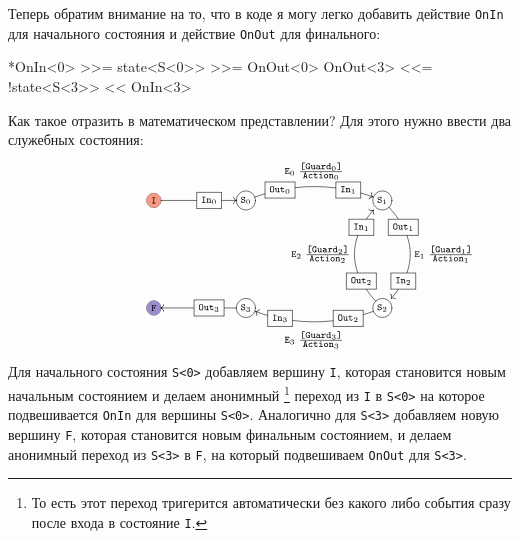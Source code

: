 \documentclass{article}
\begin{document}
{Теперь обратим внимание на то, что в коде я могу легко добавить действие \verb"OnIn" для начального состояния и действие \verb"OnOut" для финального:
\begin{cppcode}[\nonumbers]
*OnIn<0> >>= state<S<0>> >>= OnOut<0>
OnOut<3> <<= !state<S<3>> << OnIn<3>
\end{cppcode}
Как такое отразить в математическом представлении?
Для этого нужно ввести два служебных состояния:
\[
\xymatrix@R=60pt{
*+=+[o]{\phantom{\scriptstyle\texttt{Idle}}}&{}&
  *+=+[o][F*:InitialStateColor][F-]{\scriptstyle\texttt{I}}
  \ar[rr]|(0.6){\boxed{\scriptstyle\texttt{In}_0}}
  &{}&
  *+=+[o][F-]{\scriptstyle\texttt{S}_0}\ar@/^10pt/[rrr]^{\raisebox{6pt}{$\scriptstyle\texttt{E}_0\; \frac{\scriptstyle \texttt{[Guard}_0\texttt{]}}{\scriptstyle \texttt{Action}_0}$}}|(0.25){\boxed{\scriptstyle\texttt{Out}_0}}|(0.75){\boxed{\scriptstyle\texttt{In}_1}}
  &
  {}
  &
  {}
  &
  *+=+[o][F-]{\scriptstyle\texttt{S}_1}
    \ar@/^20pt/[d]^{\raisebox{0pt}{$\scriptstyle\texttt{E}_1\; \frac{\scriptstyle \texttt{[Guard}_1\texttt{]}}{\scriptstyle \texttt{Action}_1}$}}|(0.25){\boxed{\scriptstyle\texttt{Out}_1}}|(0.75){\boxed{\scriptstyle\texttt{In}_2}}
  \\
  {}&{}&
  *+=+[o][F*:FinalStateColor][F-]{\scriptstyle\texttt{F}}
  &{}&
  *+=+[o][F-]{\scriptstyle\texttt{S}_3}
  \ar[ll]|(0.4){\boxed{\scriptstyle\texttt{Out}_3}}
  &
  {}
  &
  {}
  &
  *+=+[o][F-]{\scriptstyle\texttt{S}_2}
  \ar@/^10pt/[lll]^{\raisebox{-12pt}{$\scriptstyle\texttt{E}_3\; \frac{\scriptstyle \texttt{[Guard}_3\texttt{]}}{\scriptstyle \texttt{Action}_3}$}}|(0.25){\boxed{\scriptstyle\texttt{Out}_2}}|(0.75){\boxed{\scriptstyle\texttt{In}_3}}
      \ar@/^20pt/[u]^{\raisebox{0pt}{$\scriptstyle\texttt{E}_2\; \frac{\scriptstyle \texttt{[Guard}_2\texttt{]}}{\scriptstyle \texttt{Action}_2}$}}|(0.25){\boxed{\scriptstyle\texttt{Out}_2}}|(0.75){\boxed{\scriptstyle\texttt{In}_1}}
  \\
}
\]
Для начального состояния \verb"S<0>" добавляем вершину \verb"I", которая становится новым начальным состоянием и делаем анонимный%
\footnote{То есть этот переход тригерится автоматически без какого либо события сразу после входа в состояние \texttt{I}.}
переход из \verb"I" в \verb"S<0>" на которое подвешивается \verb"OnIn" для вершины \verb"S<0>".
Аналогично для \verb"S<3>" добавляем новую вершину \verb"F", которая становится новым финальным состоянием, и делаем анонимный переход из \verb"S<3>" в \verb"F", на который подвешиваем \verb"OnOut" для \verb"S<3>".

}
\end{document}
